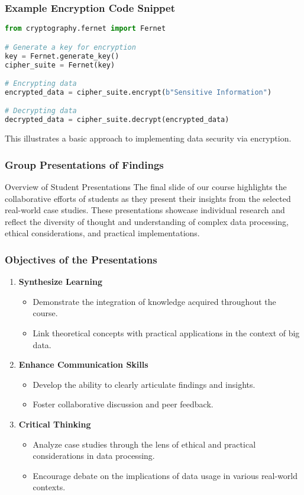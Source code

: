 \documentclass[aspectratio=169]{beamer}
\begin{document}
\begin{frame}[fragile]
    \frametitle{Example Encryption Code Snippet}
    \begin{lstlisting}[language=Python]
from cryptography.fernet import Fernet

# Generate a key for encryption
key = Fernet.generate_key()
cipher_suite = Fernet(key)

# Encrypting data
encrypted_data = cipher_suite.encrypt(b"Sensitive Information")

# Decrypting data
decrypted_data = cipher_suite.decrypt(encrypted_data)
    \end{lstlisting}
    This illustrates a basic approach to implementing data security via encryption.
\end{frame}

\begin{frame}[fragile]
    \frametitle{Group Presentations of Findings}
    \begin{block}{Overview of Student Presentations}
        The final slide of our course highlights the collaborative efforts of students as they present their insights from the selected real-world case studies. These presentations showcase individual research and reflect the diversity of thought and understanding of complex data processing, ethical considerations, and practical implementations.
    \end{block}
\end{frame}

\begin{frame}[fragile]
    \frametitle{Objectives of the Presentations}
    \begin{enumerate}
        \item \textbf{Synthesize Learning}
        \begin{itemize}
            \item Demonstrate the integration of knowledge acquired throughout the course.
            \item Link theoretical concepts with practical applications in the context of big data.
        \end{itemize}
        
        \item \textbf{Enhance Communication Skills}
        \begin{itemize}
            \item Develop the ability to clearly articulate findings and insights.
            \item Foster collaborative discussion and peer feedback.
        \end{itemize}
        
        \item \textbf{Critical Thinking}
        \begin{itemize}
            \item Analyze case studies through the lens of ethical and practical considerations in data processing.
            \item Encourage debate on the implications of data usage in various real-world contexts.
        \end{itemize}
    \end{enumerate}
\end{frame}
\end{document}
